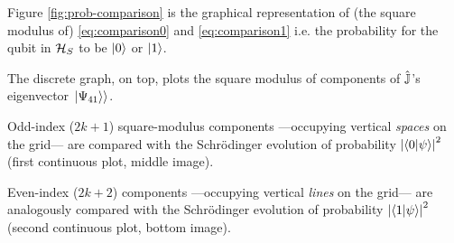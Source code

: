 Figure \ref{fig:prob-comparison} is the graphical representation of (the square modulus of)
\eqref{eq:comparison0} and \eqref{eq:comparison1} i.e. the probability for the qubit
in $\mathcal{H}_S$ to be $\ket{0}$ or $\ket{1}$.

The discrete graph, on top, plots the
square modulus of components of $\hat{\mathbb{J}}$'s eigenvector $\left.\left| \Psi_{41} \right\rangle\right\rangle$.

Odd-index ($2k+1$) square-modulus components
---occupying vertical \emph{spaces} on the grid---
are compared
with the Schr{\"o}dinger evolution of probability $\qty|\braket{0}{\psi}|^{2}$
(first continuous plot, middle image).

Even-index ($2k+2$) components
---occupying vertical \emph{lines} on the grid---
are analogously compared
with the Schr{\"o}dinger evolution of probability $\qty|\braket{1}{\psi}|^{2}$
(second continuous plot, bottom image).

